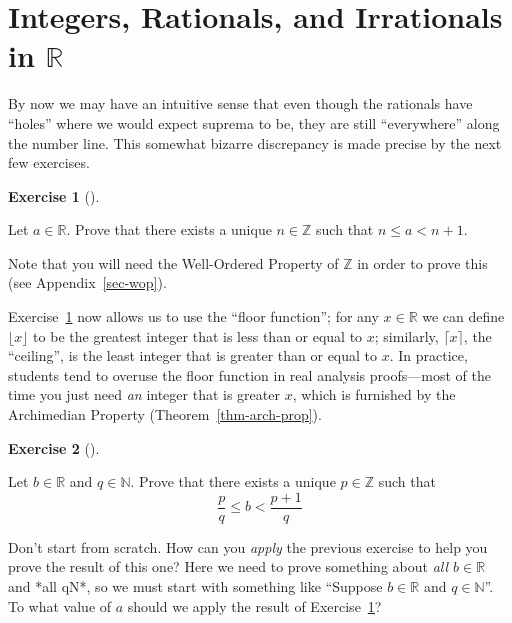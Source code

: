 \documentclass[
  letterpaper,
  DIV=11,
  numbers=noendperiod]{scrreprt}
\def\R{\mathbb R}
\def\N{\mathbb N}
\def\Z{\mathbb Z}
\theoremstyle{plain}
\theoremstyle{definition}
\newtheorem{exercise}{Exercise}[chapter]
\theoremstyle{plain}
\theoremstyle{plain}
\theoremstyle{definition}
\theoremstyle{definition}
\theoremstyle{remark}
\begin{document}
\section{\texorpdfstring{Integers, Rationals, and Irrationals in
\(\R\)}{Integers, Rationals, and Irrationals in \textbackslash R}}\label{integers-rationals-and-irrationals-in-r}

By now we may have an intuitive sense that even though the rationals
have ``holes'' where we would expect suprema to be, they are still
``everywhere'' along the number line. This somewhat bizarre discrepancy
is made precise by the next few exercises.

\begin{exercise}[]\protect\hypertarget{exr-floors}{}\label{exr-floors}

Let \(a\in\R\). Prove that there exists a unique \(n\in\Z\) such that
\(n\leq a<n+1\).

Note that you will need the Well-Ordered Property of \(\Z\) in order to
prove this (see Appendix~\ref{sec-wop}).

\end{exercise}

Exercise~\ref{exr-floors} now allows us to use the ``floor function'';
for any \(x\in \R\) we can define \(\lfloor x\rfloor\) to be the
greatest integer that is less than or equal to \(x\); similarly,
\(\lceil x\rceil\), the ``ceiling'', is the least integer that is
greater than or equal to \(x\). In practice, students tend to overuse
the floor function in real analysis proofs---most of the time you just
need \emph{an} integer that is greater \(x\), which is furnished by the
Archimedian Property (Theorem~\ref{thm-arch-prop}).

\begin{exercise}[]\protect\hypertarget{exr-rational-floor}{}\label{exr-rational-floor}

Let \(b\in\R\) and \(q\in\N\). Prove that there exists a unique
\(p\in\Z\) such that \[\frac{p}{q}\leq b< \frac{p+1}{q}\]

\end{exercise}

\begin{tcolorbox}[enhanced jigsaw, titlerule=0mm, opacitybacktitle=0.6, leftrule=.75mm, bottomrule=.15mm, left=2mm, arc=.35mm, colback=white, rightrule=.15mm, colframe=quarto-callout-tip-color-frame, toptitle=1mm, breakable, opacityback=0, colbacktitle=quarto-callout-tip-color!10!white, bottomtitle=1mm, title=\textcolor{quarto-callout-tip-color}{\faLightbulb}\hspace{0.5em}{Hint}, coltitle=black, toprule=.15mm]

Don't start from scratch. How can you \emph{apply} the previous exercise
to help you prove the result of this one? Here we need to prove
something about \emph{all \(b\in\R\)} and *all q\in\N*, so we must start
with something like ``Suppose \(b\in\R\) and \(q\in\N\)''. To what value
of \(a\) should we apply the result of Exercise~\ref{exr-floors}?

\end{tcolorbox}
\end{document}
